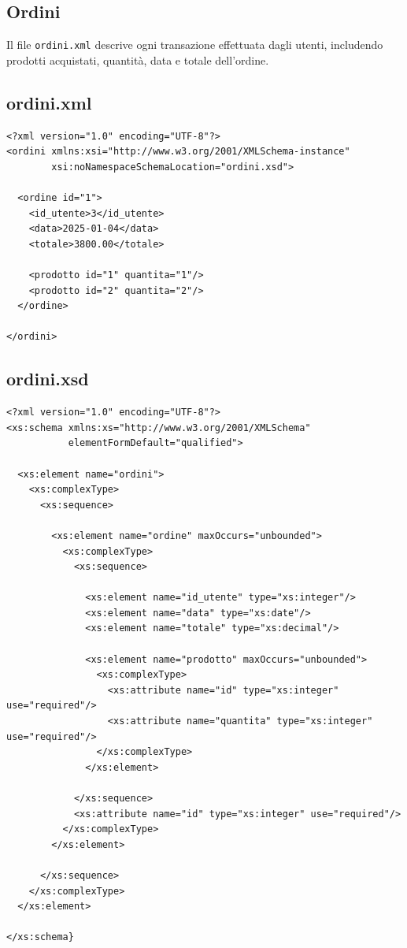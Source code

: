 \documentclass[a4paper,12pt]{report}
\begin{document}

\subsection*{Ordini}

Il file \texttt{ordini.xml} descrive ogni transazione effettuata dagli utenti,
includendo prodotti acquistati, quantità, data e totale dell'ordine.

\subsection*{ordini.xml}

{\footnotesize
\begin{lstlisting}
<?xml version="1.0" encoding="UTF-8"?>
<ordini xmlns:xsi="http://www.w3.org/2001/XMLSchema-instance"
        xsi:noNamespaceSchemaLocation="ordini.xsd">

  <ordine id="1">
    <id_utente>3</id_utente>
    <data>2025-01-04</data>
    <totale>3800.00</totale>

    <prodotto id="1" quantita="1"/>
    <prodotto id="2" quantita="2"/>
  </ordine>

</ordini>
\end{lstlisting}
}

\subsection*{ordini.xsd}

{\footnotesize
\begin{lstlisting}
<?xml version="1.0" encoding="UTF-8"?>
<xs:schema xmlns:xs="http://www.w3.org/2001/XMLSchema"
           elementFormDefault="qualified">

  <xs:element name="ordini">
    <xs:complexType>
      <xs:sequence>

        <xs:element name="ordine" maxOccurs="unbounded">
          <xs:complexType>
            <xs:sequence>

              <xs:element name="id_utente" type="xs:integer"/>
              <xs:element name="data" type="xs:date"/>
              <xs:element name="totale" type="xs:decimal"/>

              <xs:element name="prodotto" maxOccurs="unbounded">
                <xs:complexType>
                  <xs:attribute name="id" type="xs:integer" use="required"/>
                  <xs:attribute name="quantita" type="xs:integer" use="required"/>
                </xs:complexType>
              </xs:element>

            </xs:sequence>
            <xs:attribute name="id" type="xs:integer" use="required"/>
          </xs:complexType>
        </xs:element>

      </xs:sequence>
    </xs:complexType>
  </xs:element>

</xs:schema}
\end{lstlisting}
}
\end{document}
